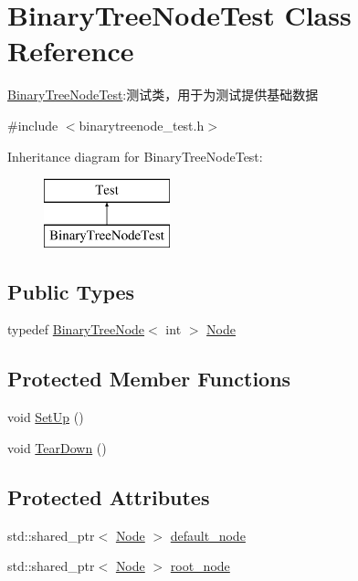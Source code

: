\hypertarget{class_binary_tree_node_test}{}\section{Binary\+Tree\+Node\+Test Class Reference}
\label{class_binary_tree_node_test}


\hyperlink{class_binary_tree_node_test}{Binary\+Tree\+Node\+Test}\+:测试类，用于为测试提供基础数据  




{\ttfamily \#include $<$binarytreenode\+\_\+test.\+h$>$}

Inheritance diagram for Binary\+Tree\+Node\+Test\+:\begin{figure}[H]
\begin{center}
\leavevmode
\includegraphics[height=2.000000cm]{class_binary_tree_node_test}
\end{center}
\end{figure}
\subsection*{Public Types}
\begin{DoxyCompactItemize}
\item 
typedef \hyperlink{struct_introdunction_to_algorithm_1_1_tree_algorithm_1_1_binary_tree_node}{Binary\+Tree\+Node}$<$ int $>$ \hyperlink{class_binary_tree_node_test_aa8508b87ef3554a5dd1069a460f38679}{Node}
\end{DoxyCompactItemize}
\subsection*{Protected Member Functions}
\begin{DoxyCompactItemize}
\item 
void \hyperlink{class_binary_tree_node_test_a60ff0f181a5e3a45742949b1948b8095}{Set\+Up} ()
\item 
void \hyperlink{class_binary_tree_node_test_a93cbc74d7d46635510578aefa62ceca5}{Tear\+Down} ()
\end{DoxyCompactItemize}
\subsection*{Protected Attributes}
\begin{DoxyCompactItemize}
\item 
std\+::shared\+\_\+ptr$<$ \hyperlink{class_binary_tree_node_test_aa8508b87ef3554a5dd1069a460f38679}{Node} $>$ \hyperlink{class_binary_tree_node_test_af2db7bcee955bff2d4d2aa815a09b329}{default\+\_\+node}
\item 
std\+::shared\+\_\+ptr$<$ \hyperlink{class_binary_tree_node_test_aa8508b87ef3554a5dd1069a460f38679}{Node} $>$ \hyperlink{class_binary_tree_node_test_a07aad40489fc19ed29863c82a6c14863}{root\+\_\+node}
\end{DoxyCompactItemize}


